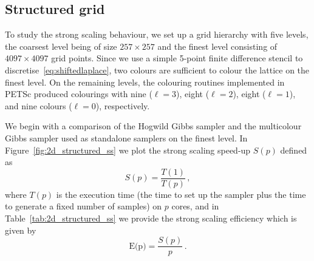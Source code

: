 \documentclass[
fontsize=11pt,
paper=a4,
numbers=noenddot
]{scrartcl}
\begin{document}
\subsection{Structured grid}
To study the strong scaling behaviour, we set up a grid hierarchy with five levels, the coarsest level being of size $257 \times 257$ and the finest level consisting of $4097 \times 4097$ grid points. Since we use a simple 5-point finite difference stencil to discretise~\eqref{eq:shiftedlaplace}, two colours are sufficient to colour the lattice on the finest level. On the remaining levels, the colouring routines implemented in PETSc produced colourings with nine ($\ell = 3$), eight ($\ell = 2$), eight ($\ell = 1$), and nine colours ($\ell = 0$), respectively.

We begin with a comparison of the Hogwild Gibbs sampler and the multicolour Gibbs sampler used as standalone samplers on the finest level. In Figure~\ref{fig:2d_structured_ss} we plot the strong scaling speed-up $S(p)$ defined as
\begin{equation*}
    S(p) = \frac{T(1)}{T(p)}\,,
\end{equation*}
where $T(p)$ is the execution time (the time to set up the sampler plus the time to generate a fixed number of samples) on $p$ cores, and in Table~\ref{tab:2d_structured_ss} we provide the strong scaling efficiency which is given by
\begin{equation*}
    \text{E(p)} = \frac{S(p)}{p}\,.
\end{equation*}
\end{document}

